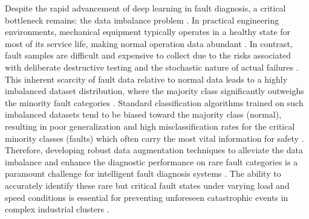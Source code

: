 Despite the rapid advancement of deep learning in fault diagnosis, a critical bottleneck remains: the data imbalance problem \cite{fan2021enhanced_gan, liu2024gan_imbalanced_review, qiao2021imbalanced_bearing}. In practical engineering environments, mechanical equipment typically operates in a healthy state for most of its service life, making normal operation data abundant \cite{qiao2021imbalanced_bearing, liu2024gan_imbalanced_review}. In contrast, fault samples are difficult and expensive to collect due to the risks associated with deliberate destructive testing and the stochastic nature of actual failures \cite{liu2020gan_smote_fault, zhao2022cnn_smote_bearing, liu2020gan_smote_fault}. This inherent scarcity of fault data relative to normal data leads to a highly imbalanced dataset distribution, where the majority class significantly outweighs the minority fault categories \cite{zhao2022cnn_smote_bearing, li2021wgan_gp_fault, qiao2021imbalanced_bearing}. Standard classification algorithms trained on such imbalanced datasets tend to be biased toward the majority class (normal), resulting in poor generalization and high misclassification rates for the critical minority classes (faults) which often carry the most vital information for safety \cite{qiao2021imbalanced_bearing, fan2021enhanced_gan, liu2024gan_imbalanced_review, fan2021enhanced_gan}. Therefore, developing robust data augmentation techniques to alleviate the data imbalance and enhance the diagnostic performance on rare fault categories is a paramount challenge for intelligent fault diagnosis systems \cite{liu2024gan_imbalanced_review, han2020wgangp_bearing, li2021wgan_gp_fault, han2020wgangp_bearing}. The ability to accurately identify these rare but critical fault states under varying load and speed conditions is essential for preventing unforeseen catastrophic events in complex industrial clusters \cite{qiao2021imbalanced_bearing, han2020wgangp_bearing}.

